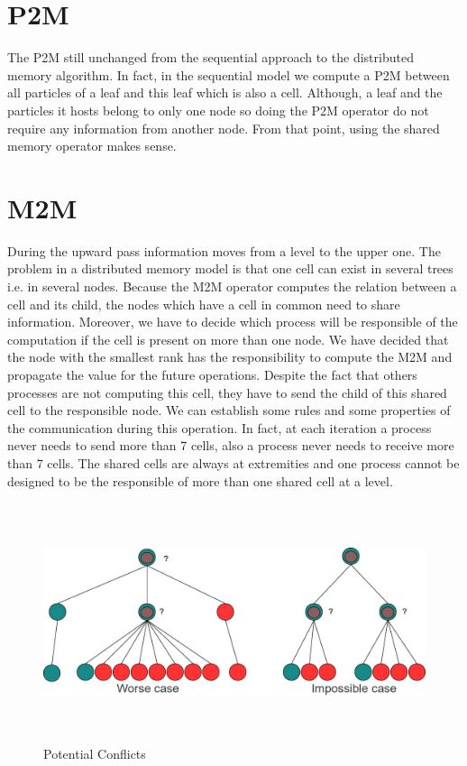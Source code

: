 \documentclass[12pt,letterpaper,titlepage]{report}
\begin{document}
\section{P2M}
The P2M still unchanged from the sequential approach to the distributed memory algorithm.
In fact, in the sequential model we compute a P2M between all particles of a leaf and this leaf which is also a cell.
Although, a leaf and the particles it hosts belong to only one node so doing the P2M operator do not require any information from another node.
From that point, using the shared memory operator makes sense.

\section{M2M}
During the upward pass information moves from a level to the upper one.
The problem in a distributed memory model is that one cell can exist in several trees i.e. in several nodes.
Because the M2M operator computes the relation between a cell and its child, the nodes which have a cell in common need to share information.
Moreover, we have to decide which process will be responsible of the computation if the cell is present on more than one node.
We have decided that the node with the smallest rank has the responsibility to compute the M2M and propagate the value for the future operations.
Despite the fact that others processes are not computing this cell, they have to send the child of this shared cell to the responsible node.
We can establish some rules and some properties of the communication during this operation.
In fact, at each iteration a process never needs to send more than 7 cells, also a process never needs to receive more than 7 cells.
The shared cells are always at extremities and one process cannot be designed to be the responsible of more than one shared cell at a level.

\begin{figure}[h!]
\begin{center}
\includegraphics[width=14cm, height=7cm, keepaspectratio=true]{ruleillu.jpg}
\caption{Potential Conflicts}
\end{center}
\end{figure}
\end{document}

